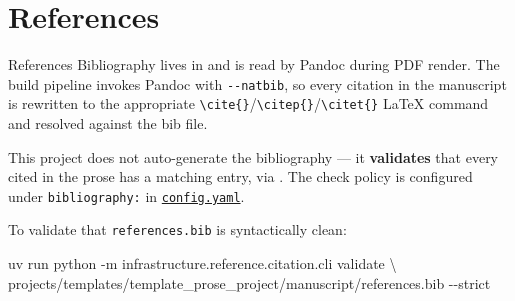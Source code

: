 \documentclass[
  ignorenonframetext,
]{beamer}
\author{\texorpdfstring{}{}}
\date{}
\newenvironment{Shaded}{}{}
\newcommand{\AttributeTok}[1]{\textcolor[rgb]{0.49,0.56,0.16}{#1}}
\newcommand{\DataTypeTok}[1]{\textcolor[rgb]{0.56,0.13,0.00}{#1}}
\newcommand{\ExtensionTok}[1]{#1}
\newcommand{\NormalTok}[1]{#1}
\begin{document}
\section{References}\label{sec:references}

\begin{frame}{References}
Bibliography lives in
\href{references.bib}{} and is read by
Pandoc during PDF render. The build pipeline invokes Pandoc with
\texttt{-\/-natbib}, so every \texttt{\breakseq{[@key]}} citation in the
manuscript is rewritten to the appropriate
\texttt{\textbackslash{}cite\{\}}/\texttt{\textbackslash{}citep\{\}}/\texttt{\textbackslash{}citet\{\}}
LaTeX command and resolved against the bib file.

This project does not auto-generate the bibliography --- it
\textbf{validates} that every \texttt{\breakseq{[@key]}} cited in the prose has
a matching entry, via
\href{../../../../infrastructure/reference/citation/SKILL.md}{}.
The check policy is configured under \texttt{bibliography:} in
\href{config.yaml}{\texttt{config.yaml}}.

To validate that \texttt{references.bib} is syntactically clean:

\begin{Shaded}
\begin{Highlighting}[]
\ExtensionTok{uv}\NormalTok{ run python }\AttributeTok{{-}m}\NormalTok{ infrastructure.reference.citation.cli validate }\DataTypeTok{\textbackslash{}}
\NormalTok{    projects/templates/template\_prose\_project/manuscript/references.bib }\AttributeTok{{-}{-}strict}
\end{Highlighting}
\end{Shaded}
\end{frame}
\end{document}
